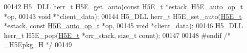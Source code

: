 \begin{DoxyCode}
00142 H5\_DLL herr\_t H5E\_get\_auto(\textcolor{keyword}{const} \hyperlink{struct_h5_e__t}{H5E\_t} *estack, \hyperlink{struct_h5_e__auto__op__t}{H5E\_auto\_op\_t} *op,
00143     \textcolor{keywordtype}{void} **client\_data);
00144 H5\_DLL herr\_t H5E\_set\_auto(\hyperlink{struct_h5_e__t}{H5E\_t} *estack, \textcolor{keyword}{const} \hyperlink{struct_h5_e__auto__op__t}{H5E\_auto\_op\_t} *op,
00145     \textcolor{keywordtype}{void} *client\_data);
00146 H5\_DLL herr\_t H5E\_pop(\hyperlink{struct_h5_e__t}{H5E\_t} *err\_stack, \textcolor{keywordtype}{size\_t} count);
00147 
00148 \textcolor{preprocessor}{#endif }\textcolor{comment}{/* \_H5Epkg\_H */}\textcolor{preprocessor}{}
00149 
\end{DoxyCode}
